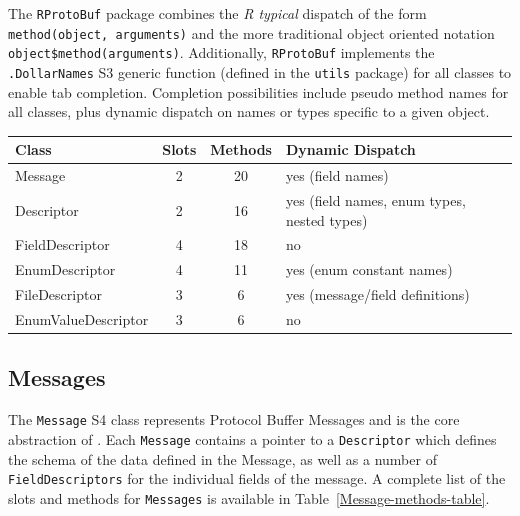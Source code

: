 \documentclass[article]{jss}
\newcommand{\CRANpkg}[1]{\pkg{#1}}
\begin{document}
The \texttt{RProtoBuf} package combines the \emph{R typical} dispatch
of the form \verb|method(object, arguments)| and the more traditional
object oriented notation \verb|object$method(arguments)|.
Additionally, \texttt{RProtoBuf} implements the \texttt{.DollarNames} S3 generic function
(defined in the \texttt{utils} package) for all classes to enable tab
completion.  Completion possibilities include pseudo method names for all
classes, plus dynamic dispatch on names or types specific to a given object.

\begin{table}[h]
\centering
\begin{tabular}{|l|c|c|l|}
\hline
\textbf{Class} & \textbf{Slots} & \textbf{Methods} & \textbf{Dynamic Dispatch}\\
\hline
\hline
Message & 2 & 20 & yes (field names)\\
\hline
Descriptor & 2 & 16 & yes (field names, enum types, nested types)\\
\hline
FieldDescriptor & 4 & 18 & no\\
\hline
EnumDescriptor & 4 & 11 & yes (enum constant names)\\
\hline
FileDescriptor & 3 & 6 & yes (message/field definitions)\\
\hline
EnumValueDescriptor & 3 & 6 & no\\
\hline
\end{tabular}
\end{table}

\subsection{Messages}

The \texttt{Message} S4 class represents Protocol Buffer Messages and
is the core abstraction of \CRANpkg{RProtoBuf}. Each \texttt{Message}
contains a pointer to a \texttt{Descriptor} which defines the schema
of the data defined in the Message, as well as a number of
\texttt{FieldDescriptors} for the individual fields of the message.  A
complete list of the slots and methods for \texttt{Messages}
is available in Table~\ref{Message-methods-table}.
\end{document}
